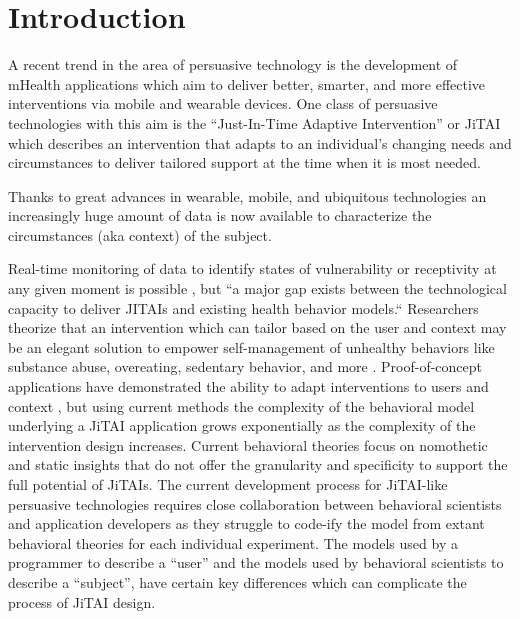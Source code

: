 \documentclass[runningheads,a4paper]{llncs}
\begin{document}
\section{Introduction}
A recent trend in the area of persuasive technology is the development of mHealth applications which aim to deliver better, smarter, and more effective interventions via mobile and wearable devices. 
One class of persuasive technologies with this aim is the “Just-In-Time Adaptive Intervention” or JiTAI which describes an intervention that adapts to an individual’s changing needs and circumstances to deliver tailored support at the time when it is most needed.

Thanks to great advances in wearable, mobile, and ubiquitous technologies an increasingly huge amount of data is now available to characterize the circumstances (aka context) of the subject.

Real-time monitoring of data to identify states of vulnerability or receptivity at any given moment is possible \cite{Hekler, Klasnja, Traver, and Hendriks, 2013}, but “a major gap exists between the technological capacity to deliver JITAIs and existing health behavior models.“ \cite{nahum2014}
Researchers theorize that an intervention which can tailor based on the user and context may be an elegant solution to empower self-management of unhealthy behaviors like substance abuse, overeating, sedentary behavior, and more \cite{nahum2014, Hekler, Patrick, and Michie, 2016}.
Proof-of-concept applications have demonstrated the ability to adapt interventions to users \cite{dallery2014optimizing, beck2010challenges} and context \cite{brailsford2010towards, collins2004}, but using current methods the complexity of the behavioral model underlying a JiTAI application grows exponentially as the complexity of the intervention design increases. 
Current behavioral theories focus on nomothetic and static insights that do not offer the granularity and specificity to support the full potential of JiTAIs\cite{riley2011health}.
The current development process for JiTAI-like persuasive technologies requires close collaboration between behavioral scientists and application developers as they struggle to code-ify the model from extant behavioral theories for each individual experiment.
The models used by a programmer to describe a “user” and the models used by behavioral scientists to describe a “subject”, have certain key differences which can complicate the process of JiTAI design.
\end{document}
